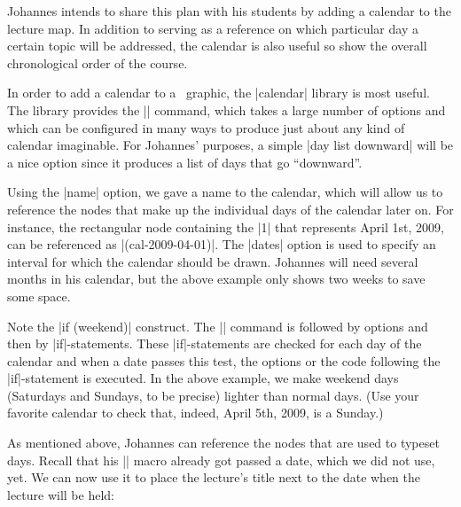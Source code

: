 Johannes intends to share this plan with his students by adding a
calendar to the lecture map. In addition to serving as a reference
on which particular day a certain  topic will be addressed, the
calendar is also useful so show the overall chronological order of the
course.

In order to add a calendar to a \tikzname\ graphic, the |calendar|
library is most useful. The library provides the |\calendar| command,
which takes a large number of options and which can be configured in
many ways to produce just about any kind of calendar imaginable. For
Johannes' purposes, a simple |day list downward| will be a nice option
since it produces a list of days that go ``downward''.

\begin{codeexample}
\tiny
{}
\end{codeexample}

Using the |name| option, we gave a name to the calendar, which will
allow us to reference the nodes that make up the individual days of
the calendar later on. For instance, the rectangular node containing the
|1| that represents April 1st, 2009, can be referenced as
|(cal-2009-04-01)|. The |dates| option is used to specify an 
interval for which the calendar should be drawn. Johannes will need
several months in his calendar, but the above example only shows two
weeks to save some space.

Note the |if (weekend)| construct. The |\calendar| command is followed
by options and then by |if|-statements. These |if|-statements are
checked for each day of the calendar and when a date passes this test,
the options or the code following the |if|-statement is executed. In
the above example, we make weekend days (Saturdays and Sundays, to be
precise) lighter than normal days. (Use your favorite calendar to
check that, indeed, April 5th, 2009, is a Sunday.)

As mentioned above, Johannes can reference the nodes that are used to
typeset days. Recall that his |\lecture| macro already got passed a
date, which we did not use, yet. We can now use it to place the
lecture's title next to the date when the lecture will be held:


\begin{codeexample}
\def\lecture#1#2#3#4#5#6{
  \node [annotation, #3, scale=0.65, text width=4cm, inner sep=2mm] at (#4) {
    Lecture #1: \textcolor{orange}{\textbf{#2}}
    \list{--}{\topsep=2pt\itemsep=0pt\parsep=0pt
              \parskip=0pt\labelwidth=8pt\leftmargin=8pt
              \itemindent=0pt\labelsep=2pt}
    #5
    \endlist
  };
  \node [anchor=base west] at (cal-#6.base east) {\textcolor{orange}{\textbf{#2}}};
}
\end{codeexample}
\def\lecture#1#2#3#4#5#6{
  \node [anchor=base west] at (cal-#6.base east) {\textcolor{orange}{\textbf{#2}}};
}

